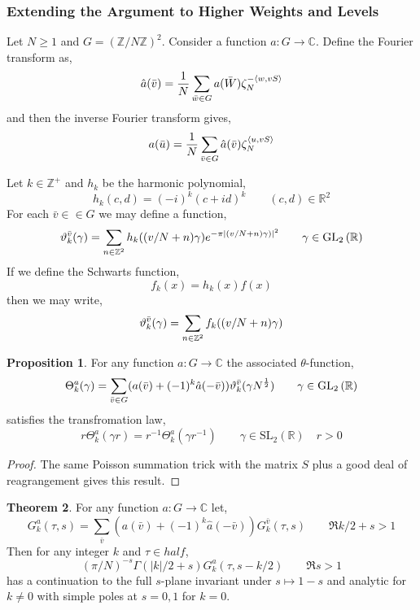 \documentclass{article}
\newcommand{\SL}[2]{\mathrm{SL}_{#1}(#2)}
\newcommand{\GL}[2]{\mathrm{GL}_{#1}\left(#2\right)}
\newcommand{\Z}{\mathbb{Z}}
\newcommand{\R}{\mathbb{R}}
\newcommand{\C}{\mathbb{C}}
\newcommand{\Zplus}{\mathbb{Z}^{+}}
\theoremstyle{definition}
\newtheorem{theorem}{Theorem}[section]
\newtheorem{proposition}[theorem]{Proposition}
\newenvironment{definition}[1][Definition:]{\begin{trivlist}
\item[\hskip \labelsep {\bfseries #1}]}{\end{trivlist}}
\begin{document}
\subsubsection{Extending the Argument to Higher Weights and Levels}

\begin{definition}
Let $N \ge 1$ and $G = (\Z / N \Z)^2$. Consider a function $a : G \to \C$. Define the Fourier transform as,
\[ \hat{a}(\bar{v}) = \frac{1}{N} \sum_{\bar{w} \in G} a(\bar{W}) \zeta_N^{- \left< w, vS \right>} \]
and then the inverse Fourier transform gives,
\[ a(\bar{u}) = \frac{1}{N} \sum_{\bar{v} \in G} \hat{a}(\bar{v}) \zeta_N^{\left< u, vS \right>} \]
\end{definition}

\begin{definition}
Let $k \in \Zplus$ and $h_k$ be the harmonic polynomial,
\[ h_k(c,d) = (-i)^k (c + id)^k \quad \quad (c,d) \in \R^2 \]
For each $\bar{v} \in \in G$ we may define a function,
\[ \vt^{\bar{v}}_k(\gamma) = \sum_{n \in \Z^2} h_k((v/N + n) \gamma) e^{-\pi |(v /N + n) \gamma)|^2} \quad \quad \gamma \in \GL{2}{\R} \]
If we define the Schwarts function,
\[ f_k(x) = h_k(x) f(x) \]
then we may write,
\[ \vt^{\bar{v}}_k(\gamma) = \sum_{n \in \Z^2} f_k((v / N + n) \gamma) \]
\end{definition}

\begin{proposition}
For any function $a : G \to \C$ the associated $\theta$-function,
\[ \Theta^a_k(\gamma) = \sum_{\bar{v} \in G} (a(\bar{v}) + (-1)^k \hat{a}(-\bar{v})) \vt^{\bar{v}}_k(\gamma N^{\frac{1}{2}}) \quad \quad \gamma \in \GL{2}{\R} \]
satisfies the transfromation law,
\[ r \Theta^a_k(\gamma r) = r^{-1} \Theta^a_k(\gamma r^{-1}) \quad \quad \gamma \in \SL{2}{\R} \quad r > 0 \]
\end{proposition}

\begin{proof}
The same Poisson summation trick with the matrix $S$ plus a good deal of reagrangement gives this result.
\end{proof}

\begin{theorem}
For any function $a : G \to \C$ let,
\[ G_k^a(\tau, s) = \sum_{\bar{v}} (a(\bar{v}) + (-1)^k \hat{a}(-\bar{v})) G^{\bar{v}}_k(\tau, s) \quad \quad \Re{k/2 + s} > 1 \]
Then for any integer $k$ and $\tau \in half$,
\[ (\pi / N)^{-s} \Gamma(|k|/2 + s) G^a_k(\tau, s - k / 2) \quad \quad \Re{s} > 1 \]
has a continuation to the full $s$-plane invariant under $s \mapsto 1 - s$ and analytic for $k \neq 0$ with simple poles at $s = 0,1$ for $k = 0$. 
\end{theorem}
\end{document}
